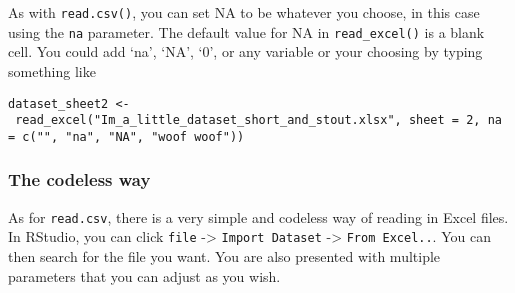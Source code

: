 \documentclass[
]{article}
\begin{document}
As with \texttt{read.csv()}, you can set NA to be whatever you choose,
in this case using the \texttt{na} parameter. The default value for NA
in \texttt{read\_excel()} is a blank cell. You could add `na', `NA',
`0', or any variable or your choosing by typing something like

\texttt{dataset\_sheet2\ \textless{}-\ read\_excel("Im\_a\_little\_dataset\_short\_and\_stout.xlsx",\ sheet\ =\ 2,\ na\ =\ c("",\ "na",\ "NA",\ "woof\ woof"))}

\hypertarget{the-codeless-way-1}{%
\subsubsection{The codeless way}\label{the-codeless-way-1}}

As for \texttt{read.csv}, there is a very simple and codeless way of
reading in Excel files. In RStudio, you can click \texttt{file}
-\textgreater{} \texttt{Import\ Dataset} -\textgreater{}
\texttt{From\ Excel..}. You can then search for the file you want. You
are also presented with multiple parameters that you can adjust as you
wish.
\end{document}
